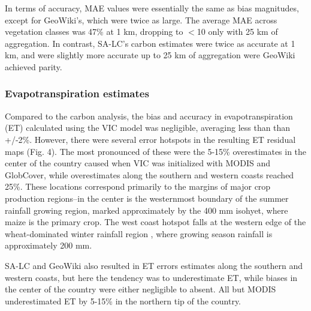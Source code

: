\documentclass[a4paper]{article}
\begin{document}
In terms of accuracy, MAE values were essentially the same as bias magnitudes, except for GeoWiki's, which were twice as large. The average MAE across vegetation classes was 47\% at 1 km, dropping to $<$10 only with 25 km of aggregation. In contrast, SA-LC's carbon estimates were twice as accurate at 1 km, and were slightly more accurate up to 25 km of aggregation were GeoWiki achieved parity.  

\vspace{-0.3 cm}
\subsubsection*{Evapotranspiration estimates}
\vspace{-0.2 cm}
Compared to the carbon analysis, the bias and accuracy in evapotranspiration (ET) calculated using the VIC model was negligible, averaging less than than +/-2\%. However, there were several error hotspots in the resulting ET residual maps (Fig. 4). The most pronounced of these were the 5-15\% overestimates in the center of the country caused when VIC was initialized with MODIS and GlobCover, while overestimates along the southern and western coasts reached 25\%. These locations correspond primarily to the margins of major crop production regions--in the center is the westernmost boundary of the summer rainfall growing region, marked approximately by the 400 mm isohyet, where maize is the primary crop. The west coast hotspot falls at the western edge of the wheat-dominated winter rainfall region \citep{hardy_rainfed_2011}, where growing season rainfall is approximately 200 mm. 

SA-LC and GeoWiki also resulted in ET errors estimates along the southern and western coasts, but here the tendency was to underestimate ET, while biases in the center of the country were either negligible to absent.  All but MODIS underestimated ET by 5-15\% in the northern tip of the country.  
%

\vspace{-0.3 cm}
\end{document}
